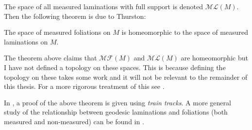 The space of all measured laminations with full support is denoted $ \mathcal{ML}(M)$. Then the following theorem is due to Thurston:
\begin{theorem}
  The space of measured foliations on $M$ is homeomorphic to the space of measured laminations on $M$. 
\end{theorem}
\begin{rem}
  The theorem above claims that $ \mathcal{MF}(M)$ and $ \mathcal{ML}(M)$ are homeomorphic but I have not defined a topology on these spaces. This is because defining the topology on these takes some work and it will not be relevant to the remainder of this thesis. For a more rigorous treatment of this see \cite{thurston-book, FLP}.
\end{rem}
\begin{rem}
  In \cite{thurston-book}, a proof of the above theorem is given using \textit{train tracks}. A more general study of the relationship between geodesic laminations and foliations (both measured and non-measured) can be found in \cite{levitt}. 
\end{rem}

